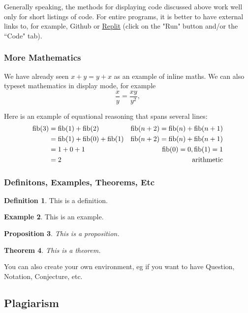 \documentclass{article}
\theoremstyle{theorem}
\newtheorem{theorem}{Theorem}[section]
\newtheorem{proposition}[theorem]{Proposition}
\theoremstyle{definition}
\newtheorem{definition}[theorem]{Definition}
\newtheorem{example}[theorem]{Example}
\theoremstyle{remark}
\begin{document}
\medskip\noindent
Generally speaking,  the methods for displaying code discussed above work well only for short listings of code. For entire programs, it is better to have external links to, for example, Github or \href{https://replit.com/@alexhkurz/automata01#main.hs}{Replit} (click on the "Run" button and/or the ``Code" tab).

\subsubsection{More Mathematics}

We have already seen $x+y=y+x$ as an example of inline maths. We can also typeset mathematics in display mode, for example
$$\frac x y =\frac{xy}{y^2},$$

\noindent
Here is an example of equational reasoning that spans several lines:
\begin{align*}
{\rm fib}(3)
& = {\rm fib}(1) +{\rm fib}(2)  & {\rm fib}(n+2) = {\rm fib}(n)  + {\rm fib}(n+1) \\
& = {\rm fib}(1) +{\rm fib}(0)  + {\rm fib}(1) & {\rm fib}(n+2) = {\rm fib}(n)  + {\rm fib}(n+1) \\
& = 1 + 0  +1 & {\rm fib}(0) = 0,   {\rm fib}(1) = 1\\
& = 2 & {\rm arithmetic}
\end{align*}

\subsubsection{Definitons, Examples, Theorems, Etc}

\begin{definition} 
This is a definition.
\end{definition}

\begin{example}
This is an example.
\end{example}

\begin{proposition}
This is a proposition.
\end{proposition}

\begin{theorem}
This is a theorem.
\end{theorem}

\noindent You can also create your own environment, eg if you want to have Question, Notation, Conjecture, etc.

\subsection{Plagiarism}
\end{document}
